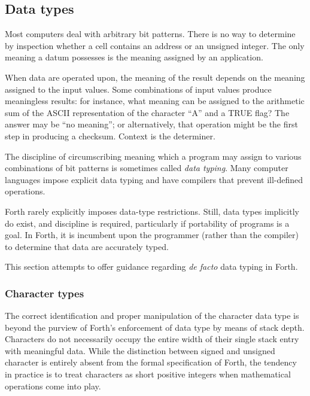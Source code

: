 \subsection{Data types} %
\label{rat:types}

Most computers deal with arbitrary bit patterns. There is no way to
determine by inspection whether a cell contains an address or an
unsigned integer. The only meaning a datum possesses is the meaning
assigned by an application.

When data are operated upon, the meaning of the result depends on
the meaning assigned to the input values. Some combinations of input
values produce meaningless results: for instance, what meaning can
be assigned to the arithmetic sum of the ASCII representation of the
character ``A'' and a TRUE flag? The answer may be ``no meaning'';
or alternatively, that operation might be the first step in
producing a checksum. Context is the determiner.

The discipline of circumscribing meaning which a program may assign
to various combinations of bit patterns is sometimes called
\emph{data typing}. Many computer languages impose explicit data
typing and have compilers that prevent ill-defined operations.

Forth rarely explicitly imposes data-type restrictions. Still, data
types implicitly do exist, and discipline is required, particularly
if portability of programs is a goal. In Forth, it is incumbent upon
the programmer (rather than the compiler) to determine that data are
accurately typed.

This section attempts to offer guidance regarding \emph{de facto}
data typing in Forth.

\setcounter{subsubsection}{1}
\subsubsection{Character types} %
\label{rat:char}

The correct identification and proper manipulation of the character
data type is beyond the purview of Forth's enforcement of data type
by means of stack depth. Characters do not necessarily occupy the
entire width of their single stack entry with meaningful data. While
the distinction between signed and unsigned character is entirely
absent from the formal specification of Forth, the tendency in
practice is to treat characters as short positive integers when
mathematical operations come into play.

